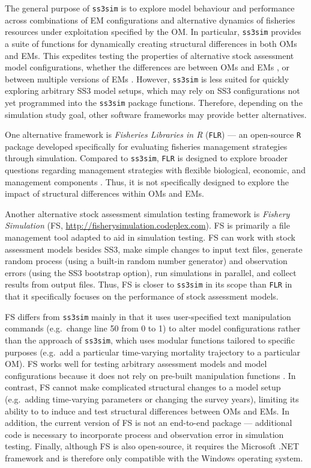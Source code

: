 \documentclass[11pt]{article}
\begin{document}
The general purpose of \texttt{ss3sim} is to explore model behaviour and performance across combinations of EM configurations and alternative dynamics of fisheries resources under exploitation specified by the OM. In particular, \texttt{ss3sim} provides a suite of functions for dynamically creating structural differences in both OMs and EMs. This expedites testing the properties of alternative stock assessment model configurations, whether the differences are between OMs and EMs \cite{johnson2013}, or between multiple versions of EMs \cite{ono2013}. However, \texttt{ss3sim} is less suited for quickly exploring arbitrary SS3 model setups, which may rely on SS3 configurations not yet programmed into the \texttt{ss3sim} package functions. Therefore, depending on the simulation study goal, other software frameworks may provide better alternatives.

One alternative framework is \emph{Fisheries Libraries in R} (\texttt{FLR}) \cite{kell2007} --- an open-source \texttt{R} package developed specifically for evaluating fisheries management strategies through simulation. Compared to \texttt{ss3sim}, \texttt{FLR} is designed to explore broader questions regarding management strategies with flexible biological, economic, and management components \cite{hillary2009}. Thus, it is not specifically designed to explore the impact of structural differences within OMs and EMs.

Another alternative stock assessment simulation testing framework is \emph{Fishery Simulation} (FS, \url{http://fisherysimulation.codeplex.com}). FS is primarily a file management tool adapted to aid in simulation testing. FS can work with stock assessment models besides SS3, make simple changes to input text files, generate random process (using a built-in random number generator) and observation errors (using the SS3 bootstrap option), run simulations in parallel, and collect results from output files. Thus, FS is closer to \texttt{ss3sim} in its scope than \texttt{FLR} in that it specifically focuses on the performance of stock assessment models.

FS differs from \texttt{ss3sim} mainly in that it uses user-specified text manipulation commands (e.g.~change line 50 from 0 to 1) to alter model configurations rather than the approach of \texttt{ss3sim}, which uses modular functions tailored to specific purposes (e.g.~add a particular time-varying mortality trajectory to a particular OM). FS works well for testing arbitrary assessment models and model configurations because it does not rely on pre-built manipulation functions \cite{lee2012, piner2011, lee2011}. In contrast, FS cannot make complicated structural changes to a model setup (e.g.~adding time-varying parameters or changing the survey years), limiting its ability to to induce and test structural differences between OMs and EMs. In addition, the current version of FS is not an end-to-end package --- additional code is necessary to incorporate process and observation error in simulation testing. Finally, although FS is also open-source, it requires the Microsoft .NET framework and is therefore only compatible with the Windows operating system.
\end{document}
